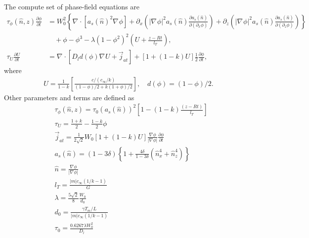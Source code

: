 \documentclass[a4paper,12pt]{article}
\renewcommand{\div}[1]{\nabla_{#1} \cdot}
\newcommand{\grad}[1]{\nabla_{#1}}
\begin{document}
The compute set of phase-field equations are 
\begin{align}
\tau_{\phi} (\hat{n},z) \frac{\partial \phi}{\partial t} &= W^2_0 \left\{ \div{} [a_s(\hat{n})^2 \grad{} \phi] +  \partial_x \left( |\grad{} \phi|^2 a_s(\hat{n}) \frac{\partial a_s(\hat{n})}{\partial (\partial_x \phi)}  \right)  +
\partial_z \left( |\grad{} \phi|^2 a_s(\hat{n}) \frac{\partial a_s(\hat{n})}{\partial (\partial_z \phi)}  \right)  \right \}  \nonumber \\
& \quad + \phi - \phi^3 - \lambda (1-\phi^2)^2 \left(U + \frac{z-R t}{ l_T} \right),  \label{eq:micro_phi}\\
\tau_U \frac{\partial U}{\partial t} &= \div{} [D_l d(\phi) \grad{} U + \vec{j}_{at}] + [1+(1-k)U]\frac{1}{2}  \frac{\partial \phi}{\partial t}, \label{eq:micro_U}
\end{align}
where 
\begin{align}
U = \frac{1}{1-k} \left[ \frac{c/(c_{\infty}/k)}{(1-\phi)/2 + k(1+\phi)/2} \right], \quad d(\phi) = (1-\phi)/2 .
\end{align}
Other parameters and terms are defined as
\begin{align}
    & \tau_{\phi}(\hat{n},z) = \tau_0(a_s(\hat{n}))^2 \left[1-(1-k) \frac{(z-Rt)}{ l_T} \right] \\
	& \tau_U = \frac{1+k}{2} - \frac{1-k}{2}\phi \\
	& \vec{j}_{at} =  \frac{1}{2\sqrt{2}} W_0 [1+(1-k)U] \frac{\nabla \phi}{|\nabla \phi|} \frac{\partial \phi}{\partial t} \\
	& a_{s}(\hat{n}) = (1-3\delta)\left\{1+\frac{4 \delta}{1-3\delta}(\hat{n}_x^4 + \hat{n}_z^4) \right\} \\
    & \hat{n} =  \frac{\nabla \phi}{|\nabla \phi|} \\
    & l_T = \frac{|m|c_{\infty}(1/k-1)}{G} \\
    & \lambda =  \frac{5\sqrt{2}}{8}  \frac{W_0}{d_0} \\
    & d_0 = \frac{\gamma T_m/L}{|m|c_{\infty}(1/k-1)}  \\
    & \tau_0 =  \frac{0.6267\lambda W_0^2}{D_l}
\end{align}
\end{document}
